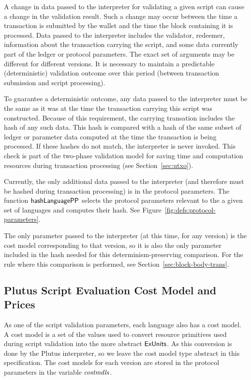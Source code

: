A change in data passed to the interpreter for
validating a given script can cause a change in the validation result. Such
a change may occur between the time a transaction is submitted by the wallet
and the time the block containing it is processed. Data passed to the interpreter
includes the validator, redeemer, information about the transaction carrying
the script, and some data currently part of the ledger or protocol parameters.
The exact set of arguments may be different for different versions.
It is necessary to maintain a predictable
(deterministic) validation outcome over this period (between transaction
submission and script processing).

To guarantee a deterministic outcome,
any data passed to the interpreter must be
the same as it was at the time the transaction carrying this script was
constructed.
Because of this requirement, the carrying transation includes the hash of any such data.
This hash is compared with
a hash of the same subset of ledger or parameter data computed at the time the transaction is being
processed. If these hashes do not match, the interpreter is never invoked.
This check is part of the two-phase validation model for saving time and computation
resources during transaction processing (see Section~\ref{sec:utxo}).

Currently, the only additional data passed to the interpreter (and therefore must
be hashed during transaction processing) is in the protocol parameters. The
function $\mathsf{hashLanguagePP}$ selects the protocol parameters relevant to
the a given set of languages and computes their hash.
See Figure~\ref{fig:defs:protocol-parameters}.

The only parameter passed to the interpreter (at this time, for any version) is the cost model
corresponding to that version, so it is also the only parameter included
in the hash needed for this determinism-preserving comparison. For the rule
where this comparison is performed, see Section~\ref{sec:block-body-trans}.

\subsection{Plutus Script Evaluation Cost Model and Prices}
\label{sec:cost-mod}

As one of the script validation parameters, each language also has a
cost model. A cost model is a set of the values used to convert resource
primitives used during script validation into the
more abstract $\mathsf{ExUnits}$. As this conversion is done by the Plutus interpreter,
so we leave the cost model type abstract in this specification.
The cost models for each version are stored in the protocol
parameters in the variable $\mathit{costmdls}$.

